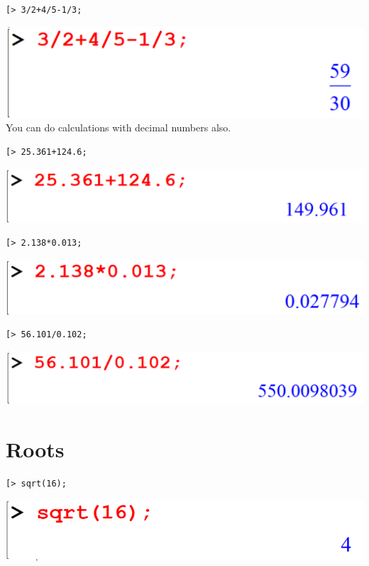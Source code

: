 \documentclass[
]{book}
\theoremstyle{definition}
\theoremstyle{definition}
\theoremstyle{definition}
\theoremstyle{definition}
\theoremstyle{remark}
\begin{document}
\begin{verbatim}
[> 3/2+4/5-1/3;
\end{verbatim}

\includegraphics{figures/Lesson 1/fig23.png}
You can do calculations with decimal numbers also.

\begin{verbatim}
[> 25.361+124.6;
\end{verbatim}

\includegraphics{figures/Lesson 1/fig24.png}

\begin{verbatim}
[> 2.138*0.013;
\end{verbatim}

\includegraphics{figures/Lesson 1/fig25.png}

\begin{verbatim}
[> 56.101/0.102;
\end{verbatim}

\includegraphics{figures/Lesson 1/fig26.png}

\section{Roots}\label{roots}

\begin{verbatim}
[> sqrt(16);
\end{verbatim}

\includegraphics{figures/Lesson 1/fig27.png}
\end{document}

